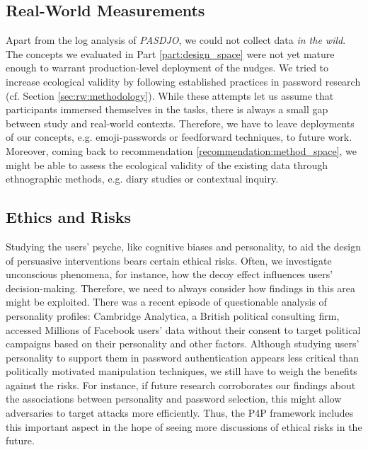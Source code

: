 \subsection{Real-World Measurements}
Apart from the log analysis of \textit{PASDJO}, we could not collect data \textit{in the wild}. The concepts we evaluated in Part \ref{part:design_space} were not yet mature enough to warrant production-level deployment of the nudges. We tried to increase ecological validity by following established practices in password research (cf. Section \ref{sec:rw:methodology}). While these attempts let us assume that participants immersed themselves in the tasks, there is always a small gap between study and real-world contexts. Therefore, we have to leave deployments of our concepts, e.g. emoji-passwords or feedforward techniques, to future work. Moreover, coming back to recommendation \ref{recommendation:method_space}, we might be able to assess the ecological validity of the existing data through ethnographic methods, e.g. diary studies or contextual inquiry.


\subsection{Ethics and Risks}
Studying the users' psyche, like cognitive biases and personality, to aid the design of persuasive interventions bears certain ethical risks. Often, we investigate unconscious phenomena, for instance, how the decoy effect influences users' decision-making. Therefore, we need to always consider how findings in this area might be exploited. There was a recent episode of questionable analysis of personality profiles: Cambridge Analytica, a British political consulting firm, accessed Millions of Facebook users' data without their consent to target political campaigns based on their personality and other factors. Although studying users' personality to support them in password authentication appears less critical than politically motivated manipulation techniques, we still have to weigh the benefits against the risks. For instance, if future research corroborates our findings about the associations between personality and password selection, this might allow adversaries to target attacks more efficiently. Thus, the P4P framework includes this important aspect in the hope of seeing more discussions of ethical risks in the future. 

